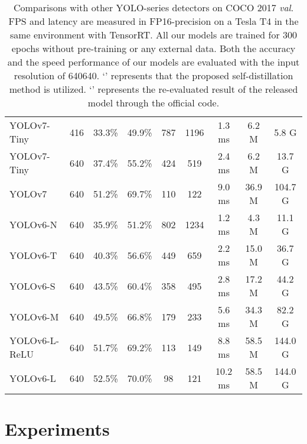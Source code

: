 \documentclass[10pt,twocolumn,letterpaper]{article}
\begin{document}
\begin{table*}[h]
{\begin{tabular}{l|c|c|c|c|c|c|c|c}
        \midrule
        \midrule
        YOLOv7-Tiny~\cite{wang2022yolov7} & 416 &33.3\% & 49.9\% & 787  &1196  & 1.3 ms & 6.2 M & 5.8 G \\
        YOLOv7-Tiny~\cite{wang2022yolov7} & 640 &37.4\% & 55.2\% & 424  & 519 & 2.4 ms & 6.2 M & 13.7 G \\
        YOLOv7~\cite{wang2022yolov7}  & 640 & 51.2\% & 69.7\% & 110 & 122 & 9.0 ms & 36.9 M& 104.7 G \\
        \midrule
        \midrule
        YOLOv6-N & 640 & 35.9\% & 51.2\% & 802 & 1234 &1.2 ms &4.3 M & 11.1 G \\
        YOLOv6-T & 640 & 40.3\% & 56.6\% & 449 & 659 &2.2 ms & 15.0 M & 36.7 G \\
        YOLOv6-S & 640 & 43.5\% & 60.4\% & 358 & 495 &2.8 ms & 17.2 M & 44.2 G \\
        YOLOv6-M & 640 & 49.5\% & 66.8\%& 179 & 233 & 5.6 ms & 34.3 M & 82.2 G \\
        YOLOv6-L-ReLU & 640 & 51.7\% & 69.2\%&  113& 149 & 8.8 ms & 58.5 M & 144.0 G \\
        YOLOv6-L & 640 & 52.5\% & 70.0\% & 98  & 121 &10.2 ms & 58.5 M & 144.0 G \\
        \bottomrule
      \end{tabular}
    }
    \caption{
      Comparisons with other YOLO-series detectors on COCO 2017 \emph{val}. FPS and latency are measured  in FP16-precision on a Tesla T4 in the same environment with TensorRT. All our models are trained for 300 epochs without pre-training or any external data. Both the accuracy and the speed performance of our models are evaluated with the input resolution of 640640. `' represents that the proposed self-distillation method is utilized. `' represents the re-evaluated result of the released model through the official code.
    }
    \label{tab:sota}
  \end{table*}

\section{Experiments}
\label{sec:exp}
\end{document}
